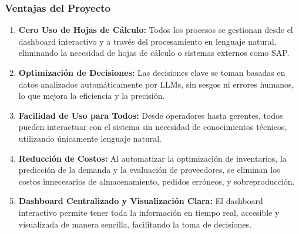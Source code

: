 \documentclass[
  10pt,
  letterpaper,
]{book}
\begin{document}
\subsubsection{Ventajas del Proyecto}\label{ventajas-del-proyecto}

\begin{enumerate}
\def\labelenumi{\arabic{enumi}.}
\item
  \textbf{Cero Uso de Hojas de Cálculo:} Todos los procesos se gestionan
  desde el dashboard interactivo y a través del procesamiento en
  lenguaje natural, eliminando la necesidad de hojas de cálculo o
  sistemas externos como SAP.
\item
  \textbf{Optimización de Decisiones:} Las decisiones clave se toman
  basadas en datos analizados automáticamente por LLMs, sin sesgos ni
  errores humanos, lo que mejora la eficiencia y la precisión.
\item
  \textbf{Facilidad de Uso para Todos:} Desde operadores hasta gerentes,
  todos pueden interactuar con el sistema sin necesidad de conocimientos
  técnicos, utilizando únicamente lenguaje natural.
\item
  \textbf{Reducción de Costos:} Al automatizar la optimización de
  inventarios, la predicción de la demanda y la evaluación de
  proveedores, se eliminan los costos innecesarios de almacenamiento,
  pedidos erróneos, y sobreproducción.
\item
  \textbf{Dashboard Centralizado y Visualización Clara:} El dashboard
  interactivo permite tener toda la información en tiempo real,
  accesible y visualizada de manera sencilla, facilitando la toma de
  decisiones.
\end{enumerate}
\end{document}
